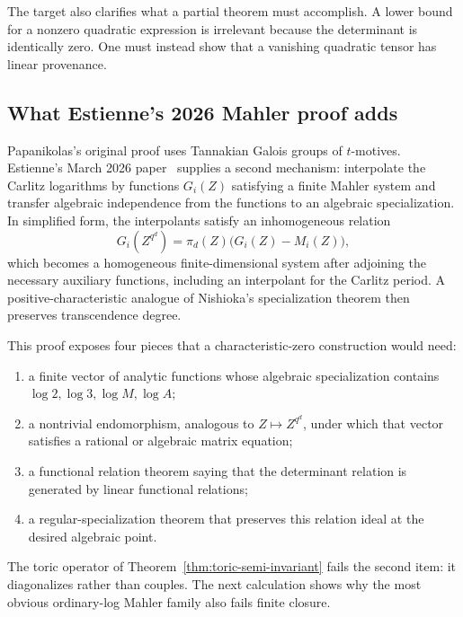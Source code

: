 \documentclass[11pt,oneside]{article}
\theoremstyle{definition}
\theoremstyle{remark}
\begin{document}
The target also clarifies what a partial theorem must accomplish.  A lower bound for a nonzero
quadratic expression is irrelevant because the determinant is identically zero.  One must instead
show that a vanishing quadratic tensor has linear provenance.

\subsection{What Estienne's 2026 Mahler proof adds}

Papanikolas's original proof uses Tannakian Galois groups of $t$-motives.  Estienne's March 2026
paper~\cite{Estienne2026} supplies a second mechanism: interpolate the Carlitz logarithms by
functions $G_i(Z)$ satisfying a finite Mahler system and transfer algebraic independence from the
functions to an algebraic specialization.  In simplified form, the interpolants satisfy an
inhomogeneous relation
\begin{equation}
  G_i(Z^{q^d})=\pi_d(Z)\bigl(G_i(Z)-M_i(Z)\bigr),
  \label{eq:Estienne-functional}
\end{equation}
which becomes a homogeneous finite-dimensional system after adjoining the necessary auxiliary
functions, including an interpolant for the Carlitz period.  A positive-characteristic analogue of
Nishioka's specialization theorem then preserves transcendence degree.

This proof exposes four pieces that a characteristic-zero construction would need:

\begin{enumerate}
\item a finite vector of analytic functions whose algebraic specialization contains
$\log2,\log3,\log M,\log A$;
\item a nontrivial endomorphism, analogous to $Z\mapsto Z^{q^d}$, under which that vector satisfies
a rational or algebraic matrix equation;
\item a functional relation theorem saying that the determinant relation is generated by linear
functional relations;
\item a regular-specialization theorem that preserves this relation ideal at the desired algebraic
point.
\end{enumerate}

The toric operator of Theorem~\ref{thm:toric-semi-invariant} fails the second item: it diagonalizes
rather than couples.  The next calculation shows why the most obvious ordinary-log Mahler family
also fails finite closure.
\end{document}
